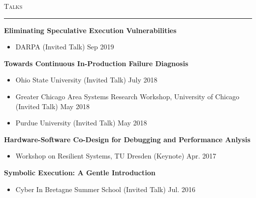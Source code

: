 \documentclass[10pt]{article}
\newcommand{\mysec}[1]{\vspace{2em}\textsc{\large #1}\vspace{1mm}\hrule\vspace{2mm}}
\newcommand{\mysub}[3]{\textbf{#1} {#2} \hfill {\em #3}}
\begin{document}
\mysec{Talks}
\mysub{Eliminating Speculative Execution Vulnerabilities}{}{}
\vspace{-2mm}
\begin{itemize}
  \setlength\itemsep{0em}
\item{DARPA (Invited Talk)} \hfill Sep 2019
\end{itemize}
\mysub{Towards Continuous In-Production Failure Diagnosis}{}{}
\vspace{-2mm}
\begin{itemize}
  \setlength\itemsep{0em}
\item{Ohio State University (Invited Talk)} \hfill July 2018
\item{Greater Chicago Area Systems Research Workshop, University of Chicago (Invited Talk)} \hfill May 2018
\item{Purdue University (Invited Talk)} \hfill May 2018
\end{itemize}
\mysub{Hardware-Software Co-Design for Debugging and Performance Anlysis}{}{}
\vspace{-2mm}
\begin{itemize}
  \setlength\itemsep{0em}
  \item{Workshop on Resilient Systems, TU Dresden (Keynote)} \hfill Apr. 2017
\end{itemize}
\mysub{Symbolic Execution: A Gentle Introduction}{}{}
\vspace{-2mm}
\begin{itemize}
  \setlength\itemsep{0em}
  \item{Cyber In Bretagne Summer School (Invited Talk)} \hfill Jul. 2016
\end{itemize}
\end{document}
